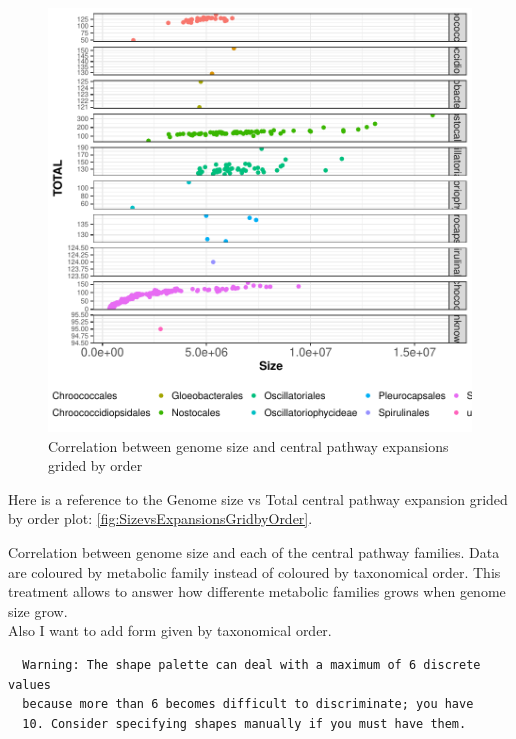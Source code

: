 \documentclass[12pt,twoside]{reedthesis}
\begin{document}
  \begin{figure}[h!tbp]
  \centering
  \includegraphics[angle = 0,scale = 1]{chapter2/Cyanobacteria/SizevsExpansionsGridbyOrder.pdf}
  \caption[Correlation between genome size and central pathway expansions grided by order]{\normalsize{Correlation between genome size and central pathway expansions grided by order}}
  \label{fig:SizevsExpansionsGridbyOrder}
  \end{figure}
  
  Here is a reference to the Genome size vs Total central pathway
  expansion grided by order plot:
  \autoref{fig:SizevsExpansionsGridbyOrder}. \clearpage 
  
  Correlation between genome size and each of the central pathway
  families. Data are coloured by metabolic family instead of coloured by
  taxonomical order. This treatment allows to answer how differente
  metabolic families grows when genome size grow.\\
  Also I want to add form given by taxonomical order.
  
  \begin{verbatim}
  Warning: The shape palette can deal with a maximum of 6 discrete values
  because more than 6 becomes difficult to discriminate; you have
  10. Consider specifying shapes manually if you must have them.
  \end{verbatim}
  
\end{document}
